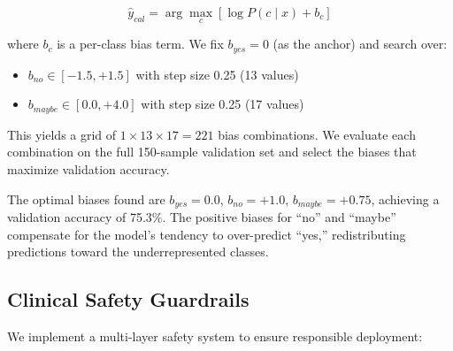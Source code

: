\documentclass[conference]{IEEEtran}
\begin{document}
\begin{equation}
    \hat{y}_{cal} = \arg\max_{c} \left[ \log P(c \mid x) + b_c \right]
\end{equation}

where $b_c$ is a per-class bias term. We fix $b_{yes} = 0$ (as the anchor) and search over:
\begin{itemize}[leftmargin=*]
    \item $b_{no} \in [-1.5, +1.5]$ with step size 0.25 (13 values)
    \item $b_{maybe} \in [0.0, +4.0]$ with step size 0.25 (17 values)
\end{itemize}

This yields a grid of $1 \times 13 \times 17 = 221$ bias combinations. We evaluate each combination on the full 150-sample validation set and select the biases that maximize validation accuracy.

The optimal biases found are $b_{yes} = 0.0$, $b_{no} = +1.0$, $b_{maybe} = +0.75$, achieving a validation accuracy of 75.3\%. The positive biases for ``no'' and ``maybe'' compensate for the model's tendency to over-predict ``yes,'' redistributing predictions toward the underrepresented classes.

\subsection{Clinical Safety Guardrails}

We implement a multi-layer safety system to ensure responsible deployment:
\end{document}
